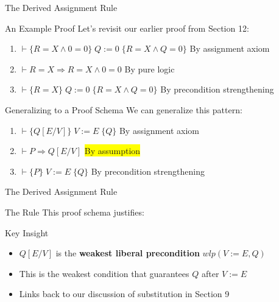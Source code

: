 \begin{frame}{The Derived Assignment Rule}
    \begin{block}{An Example Proof}
        Let's revisit our earlier proof from Section 12:
        \begin{enumerate}
            \item $\vdash \{R=X \wedge 0=0\} \; Q:=0 \; \{R=X \wedge Q=0\}$ \hfill By assignment axiom
            \item $\vdash R=X \Rightarrow R=X \wedge 0=0$ \hfill By pure logic
            \item $\vdash \{R=X\} \; Q:=0 \; \{R=X \wedge Q=0\}$ \hfill By precondition strengthening
        \end{enumerate}
    \end{block}
    
    \begin{block}{Generalizing to a Proof Schema}
        We can generalize this pattern:
        \begin{enumerate}
            \item $\vdash \{Q[E/V]\} \; V:=E \; \{Q\}$ \hfill By assignment axiom
            \item $\vdash P \Rightarrow Q[E/V]$ \hfill \colorbox{yellow}{By assumption}
            \item $\vdash \{P\} \; V:=E \; \{Q\}$ \hfill By precondition strengthening
        \end{enumerate}
    \end{block}
\end{frame}

\begin{frame}{The Derived Assignment Rule}
    \begin{block}{The Rule}
        This proof schema justifies:
        
        \begin{center}
        \end{center}
    \end{block}
    
    \begin{block}{Key Insight}
        \begin{itemize}
            \item $Q[E/V]$ is the \textbf{weakest liberal precondition} $wlp(V:=E, Q)$
            \item This is the weakest condition that guarantees $Q$ after $V:=E$
            \item Links back to our discussion of substitution in Section 9
        \end{itemize}
    \end{block}
\end{frame}


